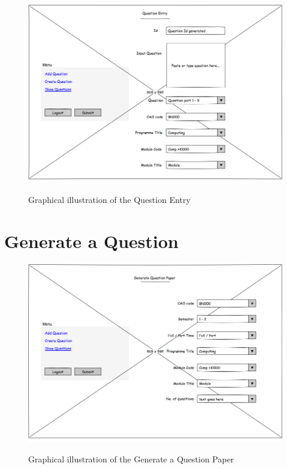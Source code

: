\begin{figure}[htbp]
\center \includegraphics[width=400pt]{Figures/Question_Entry}\\
\caption{Graphical illustration of the Question Entry} \label{Figure: Graphical illustration of the Question Entry}
\end{figure}

\newpage

\section{Generate a Question}
\label{Appendix:Coarse Zone Map}

\begin{figure}[htbp]
\center \includegraphics[width=400pt]{Figures/Generate_Question_Paper}\\
\caption{Graphical illustration of the Generate a Question Paper} \label{Figure: Graphical illustration of the Generate a Question Paper}
\end{figure}

